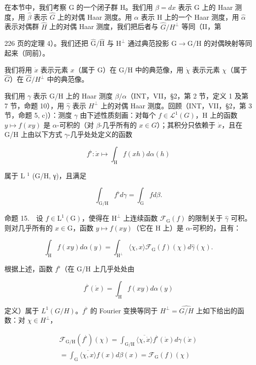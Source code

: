 在本节中，我们考察 G 的一个闭子群 H。我们用 \(\beta = dx\) 表示 G 上的 Haar 测度，用 \(\widehat{\beta}\) 表示 \(\widehat{G}\) 上的对偶 Haar 测度。用 \(\alpha\) 表示 H 上的一个 Haar 测度，用 \(\widehat{\alpha}\) 表示对偶群 \(\widehat{H}\) 上的对偶 Haar 测度，我们把后者与 \(\widehat{G}/H^{\perp}\) 等同（II，第

226 页的定理 4）。我们还把 \(\widehat{\mathrm{G}}/\widehat{\mathrm{H}}\) 与 \(\mathrm{H}^{\perp}\) 通过典范投影 \(\mathrm{G}\to\mathrm{G}/\mathrm{H}\) 的对偶映射等同起来（同前）。

我们将用 \(\dot{x}\) 表示元素 \(x\)（属于 G）在 G/H 中的典范像，用 \(\dot{\chi}\) 表示元素 \(\chi\)（属于 \(\widehat{G}\)）在 \(\widehat{G}/H^{\perp}\) 中的典范像。

我们用 \(\gamma\) 表示 G/H 上的 Haar 测度 \(\beta/\alpha\)（INT，VII，§2，第 2 节，定义 1 及第 7 节，命题 10），用 \(\widehat{\gamma}\) 表示 \(H^{\perp}\) 上的对偶 Haar 测度。回顾（INT，VII，§2，第 3 节，命题 5, c)）：测度 \(\gamma\) 由下述性质刻画：对每个 \(f \in \mathcal{L}^{1}(G)\)，H 上的函数 \(y \mapsto f(xy)\) 是 \(\alpha\)-可积的（对 \(\beta\)-几乎所有的 \(x \in G\)）；其积分只依赖于 \(\dot{x}\)，且在 G/H 上由以下方式 \(\gamma\)-几乎处处定义的函数

\[
f ^ {\flat} \colon \dot {x} \mapsto \int_ {\mathrm{H}} f (x h) d \alpha (h)
\]

属于 L \(^{1}\) (G/H, γ)，且满足

\[
\int_ {\mathrm{G} / \mathrm{H}} f ^ {\flat} d \gamma = \int_ {\mathrm{G}} f d \beta .\tag{33}
\]

命题 15.　设 \(f \in \mathrm{L}^1(\mathrm{G})\)，使得在 \(\mathrm{H}^\perp\) 上连续函数 \(\mathcal{F}_{\mathrm{G}}(f)\) 的限制关于 \(\widehat{\gamma}\) 可积。则对几乎所有的 \(x \in \mathrm{G}\)，函数 \(y \mapsto f(xy)\)（它在 \(\mathrm{H}\) 上）是 \(\alpha\)-可积的，且有：

\[
\int_ {\mathrm{H}} f (x y) d \alpha (y) = \int_ {\mathrm{H} ^ {\perp}} \langle \chi , x \rangle \mathcal {F} _ {\mathrm{G}} (f) (\chi) d \widehat {\gamma} (\chi).
\]

根据上述，函数 \(f^{\flat}\)（在 G/H 上几乎处处由

\[
f ^ {\flat} (\dot {x}) = \int_ {\mathrm{H}} f (x y) d \alpha (y)
\]

定义）属于 \(L^{1}(G/H)\)。\(f^{\flat}\) 的 Fourier 变换等同于 \(H^{\perp} = \widehat{G/H}\) 上如下给出的函数：对 \(\chi \in H^{\perp}\)，

\[
\begin{array}{r} \mathcal {F} _ {\mathrm{G/H}} (f ^ {\flat}) (\chi) = \int_ {\mathrm{G/H}} \overline {{\langle \chi , \dot {x} \rangle}} f ^ {\flat} (\dot {x}) d \gamma (\dot {x}) \\ = \int_ {\mathrm{G}} \overline {{\langle \chi , x \rangle}} f (x) d \beta (x) = \mathcal {F} _ {\mathrm{G}} (f) (\chi) \end{array}
\]

